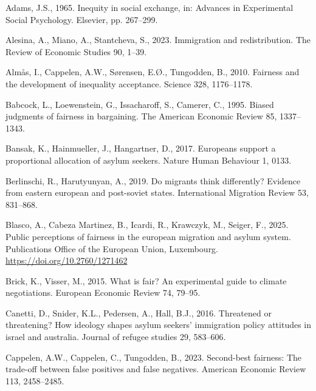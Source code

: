 \documentclass[
  12pt,
  a4paper,
]{article}
\newlength{\cslhangindent}
\newenvironment{CSLReferences}[2] %
 {\begin{list}{}{%
  \setlength{\itemindent}{0pt}
  \setlength{\leftmargin}{0pt}
  \setlength{\parsep}{0pt}
  \ifodd #1
   \setlength{\leftmargin}{\cslhangindent}
   \setlength{\itemindent}{-1\cslhangindent}
  \fi
  \setlength{\itemsep}{#2\baselineskip}}}
 {\end{list}}
\begin{document}
\protect{}\label{refs}
\begin{CSLReferences}{1}{0}
Adams, J.S., 1965. Inequity in social exchange, in: Advances in Experimental Social Psychology. Elsevier, pp. 267--299.

Alesina, A., Miano, A., Stantcheva, S., 2023. Immigration and redistribution. The Review of Economic Studies 90, 1--39.

Almås, I., Cappelen, A.W., Sørensen, E.Ø., Tungodden, B., 2010. Fairness and the development of inequality acceptance. Science 328, 1176--1178.

Babcock, L., Loewenstein, G., Issacharoff, S., Camerer, C., 1995. Biased judgments of fairness in bargaining. The American Economic Review 85, 1337--1343.

Bansak, K., Hainmueller, J., Hangartner, D., 2017. Europeans support a proportional allocation of asylum seekers. Nature Human Behaviour 1, 0133.

Berlinschi, R., Harutyunyan, A., 2019. Do migrants think differently? Evidence from eastern european and post-soviet states. International Migration Review 53, 831--868.

Blasco, A., Cabeza Martinez, B., Icardi, R., Krawczyk, M., Seiger, F., 2025. Public perceptions of fairness in the european migration and asylum system. Publications Office of the European Union, Luxembourg. \url{https://doi.org/10.2760/1271462}

Brick, K., Visser, M., 2015. What is fair? An experimental guide to climate negotiations. European Economic Review 74, 79--95.

Canetti, D., Snider, K.L., Pedersen, A., Hall, B.J., 2016. Threatened or threatening? How ideology shapes asylum seekers' immigration policy attitudes in israel and australia. Journal of refugee studies 29, 583--606.

Cappelen, A.W., Cappelen, C., Tungodden, B., 2023. Second-best fairness: The trade-off between false positives and false negatives. American Economic Review 113, 2458--2485.


\end{CSLReferences}
\end{document}
